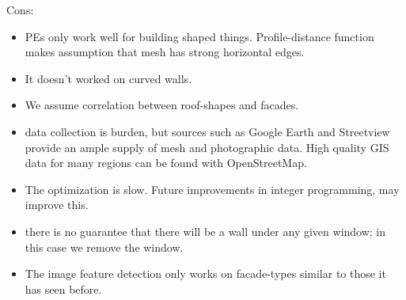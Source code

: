 Cons:
\begin{itemize}
    \item PEs only work well for building shaped things. Profile-distance function makes assumption that mesh has strong horizontal edges.
    \item It doesn't worked on curved walls.
    \item We assume correlation between roof-shapes and facades.
    \item data collection is burden, but sources such as Google Earth and Streetview provide an ample supply of mesh and photographic data. High quality GIS data for many regions can be found with OpenStreetMap.
    \item The optimization is slow. Future improvements in integer programming, may improve this.
    \item there is no guarantee that there will be a wall under any given window; in this case we remove the window. 
    \item The image feature detection only works on facade-types similar to those it has seen before.
\end{itemize}
\fi
